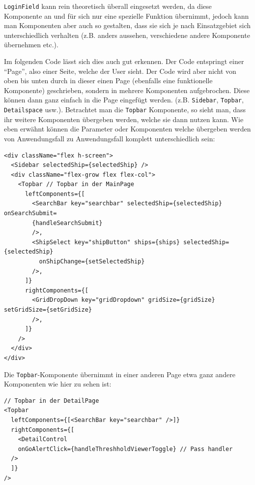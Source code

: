 \documentclass[
    headings=optiontotocandhead,%
    twoside,
    numbers=noenddot,%
    12pt, %
    titlepage, %
    parskip=full, %
    listof=leveldown, 
    numbers=noenddot, %
    a4paper,DIV=14,
    BCOR=15mm,
]{scrbook}
\newcommand{\passthrough}[1]{#1}
\begin{document}
\passthrough{\lstinline!LoginField!} kann rein theoretisch überall
eingesetzt werden, da diese Komponente an und für sich nur eine
spezielle Funktion übernimmt, jedoch kann man Komponenten aber auch so
gestalten, dass sie sich je nach Einsatzgebiet sich unterschiedlich
verhalten (z.B. anders aussehen, verschiedene andere Komponente
übernehmen etc.).

Im folgenden Code lässt sich dies auch gut erkennen. Der Code entspringt
einer ``Page'', also einer Seite, welche der User sieht. Der Code wird
aber nicht von oben bis unten durch in dieser einen Page (ebenfalls eine
funktionelle Komponente) geschrieben, sondern in mehrere Komponenten
aufgebrochen. Diese können dann ganz einfach in die Page eingefügt
werden. (z.B. \passthrough{\lstinline!Sidebar!},
\passthrough{\lstinline!Topbar!}, \passthrough{\lstinline!Detailspace!}
usw.). Betrachtet man die \passthrough{\lstinline!Topbar!} Komponente,
so sieht man, dass ihr weitere Komponenten übergeben werden, welche sie
dann nutzen kann. Wie eben erwähnt können die Parameter oder Komponenten
welche übergeben werden von Anwendungsfall zu Anwendungsfall komplett
unterschiedlich sein:

\begin{lstlisting}[caption={Unterschiedliche Verwendung von funktionelle Komponenten}]
<div className="flex h-screen">
  <Sidebar selectedShip={selectedShip} />
  <div className="flex-grow flex flex-col">
    <Topbar // Topbar in der MainPage
      leftComponents={[
        <SearchBar key="searchbar" selectedShip={selectedShip} onSearchSubmit=
        {handleSearchSubmit}
        />,
        <ShipSelect key="shipButton" ships={ships} selectedShip={selectedShip}
          onShipChange={setSelectedShip}
        />,
      ]}
      rightComponents={[
        <GridDropDown key="gridDropdown" gridSize={gridSize} setGridSize={setGridSize}
        />,
      ]}
    />
  </div>
</div>
\end{lstlisting}

Die \passthrough{\lstinline!Topbar!}-Komponente übernimmt in einer
anderen Page etwa ganz andere Komponenten wie hier zu sehen ist:

\begin{lstlisting}[caption={Alternative Verwendung der Topbar Komponente}]
// Topbar in der DetailPage
<Topbar
  leftComponents={[<SearchBar key="searchbar" />]}
  rightComponents={[
    <DetailControl
    onGoAlertClick={handleThreshholdViewerToggle} // Pass handler
  />
  ]}
/>
\end{lstlisting}
\end{document}
